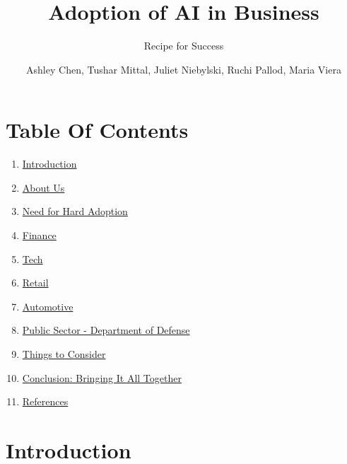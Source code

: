 \documentclass[
]{article}
\title{Adoption of AI in Business}
\subtitle{Recipe for Success}
\author{Ashley Chen, Tushar Mittal, Juliet Niebylski, Ruchi Pallod, Maria Viera}
\date{}
\providecommand{\tightlist}{%
  \setlength{\itemsep}{0pt}\setlength{\parskip}{0pt}}
\begin{document}
\maketitle

{
\setcounter{tocdepth}{2}
\tableofcontents
}
\hypertarget{table-of-contents}{%
\section*{Table Of Contents}\label{table-of-contents}}

\begin{enumerate}
\def\labelenumi{\arabic{enumi}.}
\tightlist
\item
  \href{https://tmittala.github.io/Recipe_for_Success/introduction.html}{Introduction}
\item
  \href{https://tmittala.github.io/Recipe_for_Success/about-us.html}{About Us}
\item
  \href{https://tmittala.github.io/Recipe_for_Success/need-for-hard-adoption.html}{Need for Hard Adoption}
\item
  \href{https://tmittala.github.io/Recipe_for_Success/finance.html}{Finance}
\item
  \href{https://tmittala.github.io/Recipe_for_Success/tech.html}{Tech}
\item
  \href{https://tmittala.github.io/Recipe_for_Success/retail.html}{Retail}
\item
  \href{https://tmittala.github.io/Recipe_for_Success/automotive.html}{Automotive}
\item
  \href{https://tmittala.github.io/Recipe_for_Success/public-sector---department-of-defense.html}{Public Sector - Department of Defense}
\item
  \href{https://tmittala.github.io/Recipe_for_Success/things-to-consider.html}{Things to Consider}
\item
  \href{https://tmittala.github.io/Recipe_for_Success/conclusion-bringing-it-all-together.html}{Conclusion: Bringing It All Together}
\item
  \href{https://tmittala.github.io/Recipe_for_Success/references.html}{References}
\end{enumerate}

\hypertarget{introduction}{%
\section{Introduction}\label{introduction}}
\end{document}
